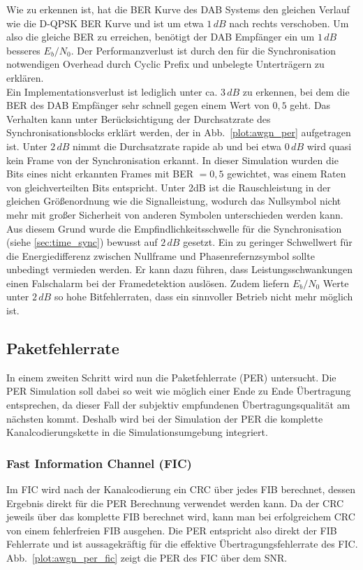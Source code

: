 Wie zu erkennen ist, hat die BER Kurve des DAB Systems den gleichen Verlauf wie die D-QPSK BER Kurve und ist um etwa $1\, dB$ nach rechts verschoben. Um also die gleiche BER zu erreichen, benötigt der DAB Empfänger ein um $1\, dB$ besseres $E_b/N_0$. Der Performanzverlust ist durch den für die Synchronisation notwendigen Overhead durch Cyclic Prefix und unbelegte Unterträgern zu erklären.\\
Ein Implementationsverlust ist lediglich unter ca. $3\, dB$ zu erkennen, bei dem die BER des DAB Empfänger sehr schnell gegen einem Wert von $0,5$ geht. Das Verhalten kann unter Berücksichtigung der Durchsatzrate des Synchronisationsblocks erklärt werden, der in Abb.~\ref{plot:awgn_per} aufgetragen ist. Unter $2\, dB$ nimmt die Durchsatzrate rapide ab und bei etwa $0\, dB$ wird quasi kein Frame von der Synchronisation erkannt. In dieser Simulation wurden die Bits eines nicht erkannten Frames mit BER $= 0,5$ gewichtet, was einem Raten von gleichverteilten Bits entspricht. Unter 2dB ist die Rauschleistung in der gleichen Größenordnung wie die Signalleistung, wodurch das Nullsymbol nicht mehr mit großer Sicherheit von anderen Symbolen unterschieden werden kann. Aus diesem Grund wurde die Empfindlichkeitsschwelle für die Synchronisation (siehe \ref{sec:time_sync}) bewusst auf $2\, dB$ gesetzt. Ein zu geringer Schwellwert für die Energiedifferenz zwischen Nullframe und Phasenrefernzsymbol sollte unbedingt vermieden werden. Er kann dazu führen, dass Leistungsschwankungen einen Falschalarm bei der Framedetektion auslösen. Zudem liefern $E_b/N_0$ Werte unter $2\, dB$ so hohe Bitfehlerraten, dass ein sinnvoller Betrieb nicht mehr möglich ist.

\subsection{Paketfehlerrate}
In einem zweiten Schritt wird nun die Paketfehlerrate (PER) untersucht. Die PER Simulation soll dabei so weit wie möglich einer Ende zu Ende Übertragung entsprechen, da dieser Fall der subjektiv empfundenen Übertragungsqualität am nächsten kommt. Deshalb wird bei der Simulation der PER die komplette Kanalcodierungskette in die Simulationsumgebung integriert.\\
\subsubsection{Fast Information Channel (FIC)}
Im FIC wird nach der Kanalcodierung ein CRC über jedes FIB berechnet, dessen Ergebnis direkt für die PER Berechnung verwendet werden kann. Da der CRC jeweils über das komplette FIB berechnet wird, kann man bei erfolgreichem CRC von einem fehlerfreien FIB ausgehen. Die PER entspricht also direkt der FIB Fehlerrate und ist aussagekräftig für die effektive Übertragungsfehlerrate des FIC. Abb.~\ref{plot:awgn_per_fic} zeigt die PER des FIC über dem SNR.\\


